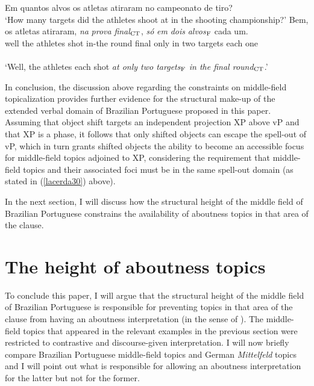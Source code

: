 \documentclass[output=paper]{langscibook}
\begin{document}
\begin{exe}
\ex \label{lacerda34}
\begin{xlist}
 \label{lacerda34A}
Em quantos alvos os atletas atiraram no campeonato de tiro?\\
‘How many targets did the athletes shoot at in the shooting championship?’	
 \label{lacerda34B}
\gll Bem,	os 	atletas 	atiraram, 	\emph{na} 	\emph{prova} 	\emph{final}$_{\textnormal{CT}}$, 	\emph{só} 	\emph{em} 	\emph{dois} 	\emph{alvos}$_{\textnormal{F}}$ 	cada 	um.\\
well 	the 	athletes 	shot 	in-the 	round 	final 	only 	in 	two 	targets	each	one\\\\
	‘Well, the athletes each shot \emph{at only two targets$_{\textnormal{F}}$ in the final round}$_{\textnormal{CT}}$.’
\end{xlist}

\end{exe}

In conclusion, the discussion above regarding the constraints on middle-field topicalization provides further evidence for the structural make-up of the extended verbal domain of Brazilian Portuguese proposed in this paper. Assuming that object shift targets an independent projection XP above vP and that XP is a phase, it follows that only shifted objects can escape the spell-out of vP, which in turn grants shifted objects the ability to become an accessible focus for middle-field topics adjoined to XP, considering the requirement that middle-field topics and their associated foci must be in the same spell-out domain (as stated in (\ref{lacerda30}) above).

In the next section, I will discuss how the structural height of the middle field of Brazilian Portuguese constrains the availability of aboutness topics in that area of the clause.

\section{The height of aboutness topics}
To conclude this paper, I will argue that the structural height of the middle field of Brazilian Portuguese is responsible for preventing topics in that area of the clause from having an aboutness interpretation (in the sense of \citealt{Reinhart1981}). The middle-field topics that appeared in the relevant examples in the previous section were restricted to contrastive and discourse-given interpretation. I will now briefly compare Brazilian Portuguese middle-field topics and German \emph{Mittelfeld} topics and I will point out what is responsible for allowing an aboutness interpretation for the latter but not for the former.
\end{document}
